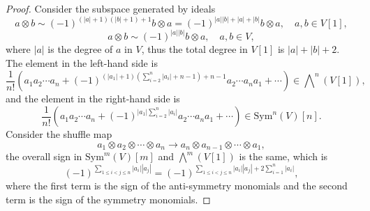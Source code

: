 \documentclass[10pt]{article}
\begin{document}
\begin{proof}
  Consider the subspace generated by ideals
  \begin{equation*}
    a \otimes b \sim (-1)^{(|a|+1)(|b| + 1) + 1} b \otimes a = (-1)^{|a||b| + |a| + |b|} b \otimes a, \quad a,b \in V[1],
  \end{equation*}
  \begin{equation*}
    a \otimes b \sim (-1)^{|a||b|} b \otimes a, \quad a,b \in V,
  \end{equation*}
  where $\left| a \right|$ is the degree of $ a$ in $ V$, thus the total degree in $ V[1]$ is $\left| a \right| + \left| b \right| + 2$.
  The element in the left-hand side is
  \begin{equation*}
    \frac{1}{n!} \left( a_1a_2 \cdots a_n + (-1)^{(\left| a_1 \right|+1) \left( \sum_{i=2}^{n} \left| a_i \right| + n-1\right) + n - 1} a_2 \cdots a_n a_1  + \cdots \right) \in \bigwedge\nolimits^{n} \left( V[1] \right),
  \end{equation*}
  and the element in the right-hand side is
  \begin{equation*}
    \frac{1}{n!} \left( a_1a_2 \cdots a_n + (-1)^{\left| a_1 \right| \sum_{i=2}^{n} \left| a_i \right| } a_2 \cdots a_n a_1  + \cdots \right) \in \mathrm{Sym}^{n} (V)[n].
  \end{equation*}
  Consider the shuffle map
  \begin{equation*}
    a_1 \otimes a_2 \otimes \cdots \otimes a_n \rightarrow a_n \otimes a_{n-1} \otimes \cdots \otimes a_{1},
  \end{equation*}
  the overall sign in $ \mathrm{Sym}^{m}(V)[m]$ and $\bigwedge^{m}(V[1])$ is the same, which is
  \begin{equation*}
    (-1)^{\sum_{1 \le i < j \le n} \left| a_i \right| \left| a_j \right|} = (-1)^{\sum_{1 \le i < j \le n} \left| a_i \right|\left| a_j \right| + 2 \sum_{i=1}^{n} \left| a_i \right|},
  \end{equation*}
  where the first term is the sign of the anti-symmetry monomials and the second term is the sign of the symmetry monomials.

\end{proof}
\end{document}
